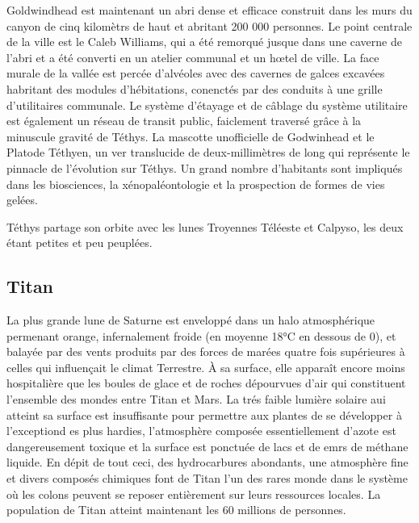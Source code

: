                                                                      Goldwindhead est maintenant un abri dense et efficace construit dans les murs du canyon de cinq kilomètrs de haut et abritant 200 000 personnes. Le point centrale de la ville est le Caleb Williams, qui a été remorqué jusque dans une caverne de l'abri et a été converti en un atelier communal et un hœtel de ville. La face murale de la vallée est percée d'alvéoles avec des cavernes de galces excavées habritant des modules d'hébitations, conenctés par des conduits à une grille d'utilitaires communale. Le système d'étayage et de câblage du système utilitaire est également un réseau de transit public, faiclement traversé grâce à la minuscule gravité de Téthys. La mascotte unofficielle de Godwinhead et le Platode Téthyen, un ver translucide de deux-millimètres de long qui représente le pinnacle de l'évolution sur Téthys. Un grand nombre d'habitants sont impliqués dans les biosciences, la xénopaléontologie et la prospection de formes de vies gelées. 

                                                                     Téthys partage son orbite avec les lunes Troyennes Téléeste et Calpyso, les deux étant petites et peu peuplées. 

                                                                     \subsection{Titan} \label{sec:titan} 

                                                                     La plus grande lune de Saturne est enveloppé dans un halo atmosphérique permenant orange, infernalement froide (en moyenne 18°C en dessous de 0), et balayée par des vents produits par des forces de marées quatre fois supérieures à celles qui influençait le climat Terrestre. À sa surface, elle apparaît encore moins hospitalière que les boules de glace et de roches dépourvues d'air qui constituent l'ensemble des mondes entre Titan et Mars. La trés faible lumière solaire aui atteint sa surface est insuffisante pour permettre aux plantes de se développer à l'exceptiond es plus hardies, l'atmosphère composée essentiellement d'azote est dangereusement toxique et la surface est ponctuée de lacs et de emrs de méthane liquide. En dépit de tout ceci, des hydrocarbures abondants, une atmosphère fine et divers composés chimiques font de Titan l'un des rares monde dans le système où les colons peuvent se reposer entièrement sur leurs ressources locales. La population de Titan atteint maintenant les 60 millions de personnes. 

